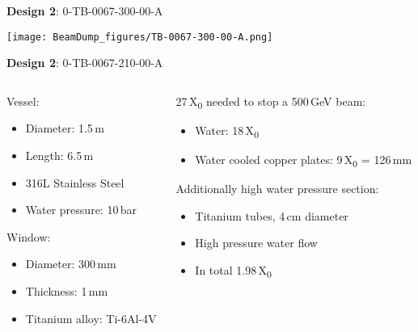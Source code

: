 \documentclass[xcolor={dvipsnames}]{beamer}
\begin{document}
\begin{frame}{\textbf{Design 2}: 0-TB-0067-300-00-A}
\begin{center}
  \texttt{[image: BeamDump\_figures/TB-0067-300-00-A.png]}
 \end{center}
\end{frame}
{
\begin{frame}{\textbf{Design 2}: 0-TB-0067-210-00-A}
\begin{columns}
 \begin{column}{0.5\textwidth}
  Vessel:
  \begin{itemize}
   \item Diameter: 1.5\,m
   \item Length: 6.5\,m
   \item 316L Stainless Steel
   \item Water pressure: 10\,bar
  \end{itemize}
  Window:
  \begin{itemize}
   \item Diameter: 300\,mm
   \item Thickness: 1\,mm
   \item Titanium alloy: Ti-6Al-4V 
  \end{itemize}
 \end{column}
 \begin{column}{0.5\textwidth}
  27\,X\textsubscript{0} needed to stop a 500\,GeV beam:
  \begin{itemize}
   \item Water: 18\,X\textsubscript{0}
   \item Water cooled copper plates: 9\,X\textsubscript{0} = 126\,mm
  \end{itemize}  
    Additionally high water pressure section:
  \begin{itemize}
   \item Titanium tubes, 4\,cm diameter
   \item High pressure water flow
   \item In total 1.98\,X\textsubscript{0}
  \end{itemize} 
 \end{column}
\end{columns}

\end{frame}
}
\end{document}
